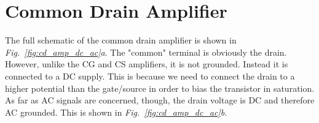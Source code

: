 \section{Common Drain Amplifier}
The full schematic of the common drain amplifier is shown in \emph{Fig.~\ref{fig:cd_amp_dc_ac}a}.  The "common" terminal is obviously the drain.  However, unlike the CG and CS amplifiers, it is not grounded. Instead it is connected to a DC supply.  This is because we need to connect the drain to a higher potential than the gate/source in order to bias the transistor in saturation.  As far as AC signals are concerned, though, the drain voltage is DC and therefore AC grounded.  This is shown in \emph{Fig.~\ref{fig:cd_amp_dc_ac}b}.
